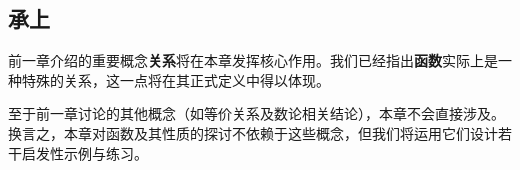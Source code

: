 
\subsection{承上}

前一章介绍的重要概念\textbf{关系}将在本章发挥核心作用。我们已经指出\textbf{函数}实际上是一种特殊的关系，这一点将在其正式定义中得以体现。

至于前一章讨论的其他概念（如等价关系及数论相关结论），本章不会直接涉及。换言之，本章对函数及其性质的探讨不依赖于这些概念，但我们将运用它们设计若干启发性示例与练习。
